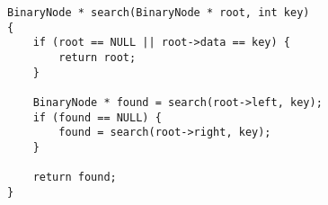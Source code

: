 \begin{lstlisting}[style=CStyle]
BinaryNode * search(BinaryNode * root, int key) 
{
    if (root == NULL || root->data == key) {
        return root;
    }

    BinaryNode * found = search(root->left, key);
    if (found == NULL) {
        found = search(root->right, key);
    }

    return found;
}
\end{lstlisting}
            